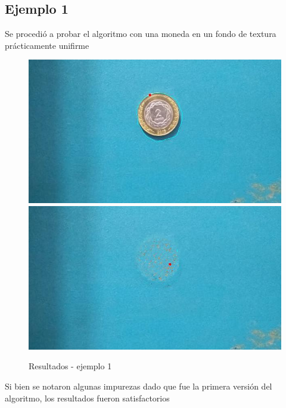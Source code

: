\documentclass[conference]{IEEEtran}
\begin{document}
\subsection{Ejemplo 1}
Se procedió a probar el algoritmo con una moneda en un fondo de textura prácticamente unifirme
\begin{figure}[H]
\begin{centering}
\includegraphics[scale=0.19]{moneda1.jpeg}
\includegraphics[scale=0.19]{moneda2.jpeg}
\par\end{centering}
\caption{Resultados - ejemplo 1}
\end{figure}
Si bien se notaron algunas impurezas dado que fue la primera versión del algoritmo, los resultados fueron satisfactorios
\end{document}
